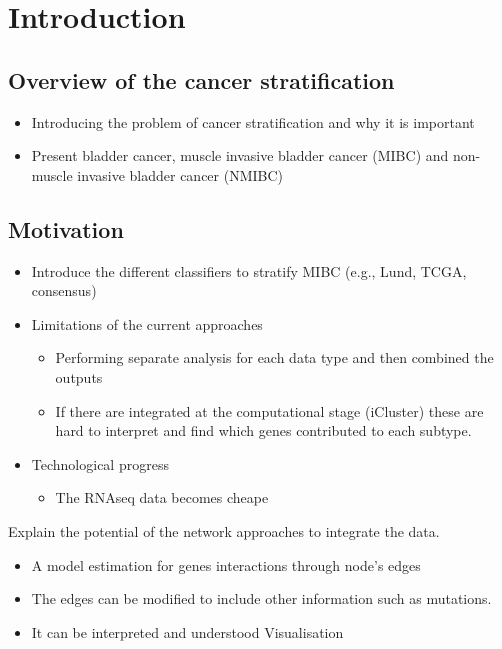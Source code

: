 
\section{Introduction}

\subsection{Overview of the cancer stratification}

\begin{itemize}
    \item Introducing the problem of cancer stratification and why it is important
    \item Present bladder cancer, muscle invasive bladder cancer (MIBC) and non-muscle invasive bladder cancer (NMIBC)
\end{itemize}

\subsection{Motivation}

\begin{itemize}
    \item Introduce the different classifiers to stratify MIBC (e.g., Lund, TCGA, consensus)
    \item Limitations of the current approaches
    \begin{itemize}
        \item Performing separate analysis for each data type and then combined the outputs 
        \item If there are integrated at the computational stage (iCluster) these are hard to interpret and find which genes contributed to each subtype.
    \end{itemize}
    \item Technological progress    
    \begin{itemize}
        \item The RNAseq data becomes cheape
    \end{itemize}
\end{itemize}


Explain the potential of the network approaches to integrate the data.
\begin{itemize}
    \item A model estimation for genes interactions through node’s edges
    \item The edges can be modified to include other information such as mutations.
    \item It can be interpreted and understood 
    Visualisation
\end{itemize}

